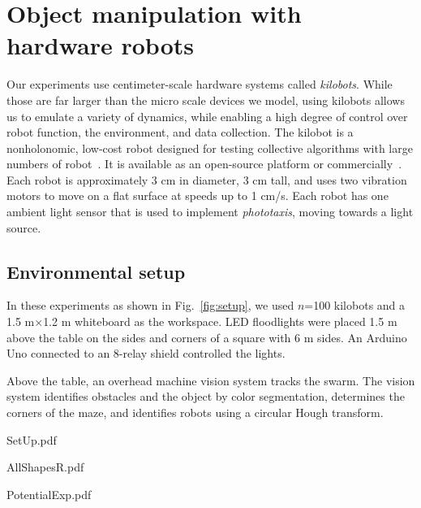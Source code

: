 
\section{Object manipulation with hardware robots}\label{sec:realExperiment}
Our experiments use centimeter-scale hardware systems called \emph{kilobots}.  While those are far larger than the micro scale devices we model, using kilobots allows us to emulate a variety of dynamics, while enabling a high degree of control over robot function, the environment, and data collection. The kilobot is a nonholonomic, low-cost robot designed for testing collective algorithms with large numbers of robot~\cite{Rubenstein2012,rubenstein2014programmable}. It is available as an open-source platform or commercially~\cite{K-Team2015}.  Each robot is approximately 3 cm in diameter, 3 cm tall, and uses two vibration motors to move on a flat surface at speeds up to 1 cm/s.  Each robot has one ambient light sensor that is used to implement \emph{phototaxis},  moving towards a light source. 

  
\subsection{Environmental setup}  
In these experiments as shown in Fig.~\ref{fig:setup}, we used $n$=100 kilobots and a 1.5 m$\times$1.2 m whiteboard as the workspace. 
LED floodlights were placed 1.5 m above the table on the sides and corners of a square with 6 m sides. An Arduino Uno connected to an 8-relay shield controlled the lights.  

Above the table, an overhead machine vision system tracks the swarm. The vision system identifies obstacles and the object by color segmentation, determines the corners of the maze, and identifies robots using a circular Hough transform. 

\begin{figure*}
\renewcommand{\figwid}{5.25cm}
\begin{center}
	\begin{overpic}[height=\figwid]{SetUp.pdf}%
	\end{overpic}\begin{overpic}[height=5.5cm]{AllShapesR.pdf}%
	\end{overpic}\begin{overpic}[height=\figwid]{PotentialExp.pdf}%
	\end{overpic}
\end{center}
\caption{\label{fig:setup}
Hardware platform. At right are the shapes used for hardware experiments and a visualization of the potential field. }
\end{figure*}


